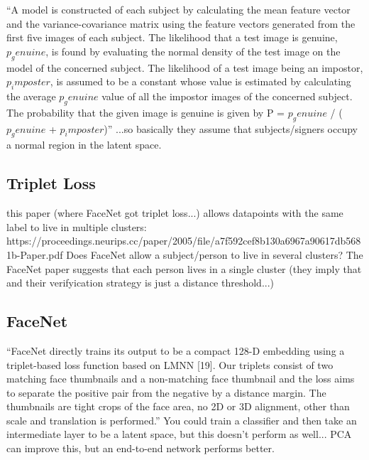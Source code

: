 ``A model is constructed of each subject by calculating the mean feature
vector and the variance-covariance matrix using the feature
vectors generated from the first five images of each subject.
The likelihood that a test image is genuine, $p_genuine$, is
found by evaluating the normal density of the test image on
the model of the concerned subject. The likelihood of a test
image being an impostor, $p_imposter$, is assumed to be a constant whose value is estimated by calculating the average $p_genuine$ value of all the impostor images of the concerned
subject. The probability that the given image is genuine is
given by P = $p_genuine$ / ($p_genuine$ + $p_imposter$)''
...so basically they assume that subjects/signers occupy a normal region in the latent space.

\subsection{Triplet Loss}
this paper (where FaceNet got triplet loss...) allows datapoints with the same label to live in multiple clusters:
https://proceedings.neurips.cc/paper/2005/file/a7f592cef8b130a6967a90617db5681b-Paper.pdf
Does FaceNet allow a subject/person to live in several clusters?
The FaceNet paper suggests that each person lives in a single cluster (they imply that and their verifyication strategy is just a distance threshold...)

\subsection{FaceNet}
``FaceNet directly trains
its output to be a compact 128-D embedding using a triplet-based loss function based on LMNN [19]. Our triplets consist of two matching face thumbnails and a non-matching
face thumbnail and the loss aims to separate the positive pair
from the negative by a distance margin. The thumbnails are
tight crops of the face area, no 2D or 3D alignment, other
than scale and translation is performed.''
You could train a classifier and then take an intermediate layer to be a latent space, but this doesn't perform as well...
PCA can improve this, but an end-to-end network performs better.
\cite{face_net}

